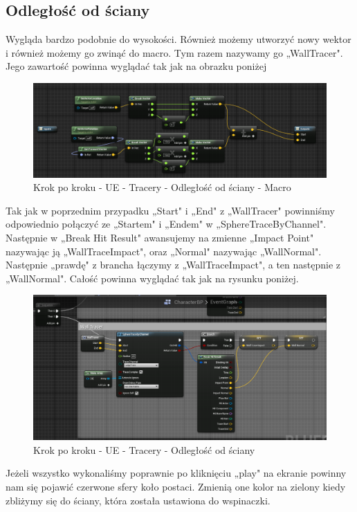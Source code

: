 \documentclass[openright]{xmgr}
\begin{document}
\subsection{Odległość od ściany}

Wygląda bardzo podobnie do wysokości. Również możemy utworzyć nowy wektor i również możemy go zwinąć do macro. Tym razem nazywamy go „WallTracer". Jego zawartość powinna wyglądać tak jak na obrazku poniżej

\begin{figure}[!htb]
    \begin{center}
    \includegraphics[scale=0.5]{Screeny/UeKrokPoKroku/WallMacro}
    \end{center}
    \caption{Krok po kroku - UE - Tracery - Odległość od ściany - Macro}
\end{figure}

\newpage
Tak jak w poprzednim przypadku „Start" i „End" z „WallTracer" powinniśmy odpowiednio połączyć ze „Startem" i „Endem" w „SphereTraceByChannel". Następnie w „Break Hit Result" awansujemy na zmienne „Impact Point" nazywając ją „WallTraceImpact", oraz „Normal" nazywając „WallNormal". Następnie „prawdę" z brancha łączymy z „WallTraceImpact", a ten następnie z „WallNormal". Całość powinna wyglądać tak jak na rysunku poniżej.

\begin{figure}[!htb]
    \begin{center}
    \includegraphics[scale=0.35]{Screeny/UeKrokPoKroku/UE-WallTracer}
    \end{center}
    \caption{Krok po kroku - UE - Tracery - Odległość od ściany}
\end{figure}
\newpage
Jeżeli wszystko wykonaliśmy poprawnie po kliknięciu „play" na ekranie powinny nam się pojawić czerwone sfery koło postaci. Zmienią one kolor na zielony kiedy zbliżymy się do ściany, która została ustawiona do wspinaczki.
\end{document}

